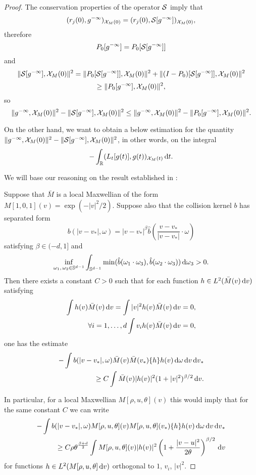 \begin{proof}
	The conservation properties of the operator $\mathcal S$ imply that 
	\[(r_j(0),  {g^{-\infty}})_{{\mathcal X_M(0)}}=
	(r_j(0),  \mathcal S[{g^{-\infty}}]  )_{{\mathcal X_M(0)}},\]
	therefore
	\[P_0[{g^{-\infty}}] = P_0[\mathcal S[{g^{-\infty}}]]\]
	and
	\[\|\mathcal S[{g^{-\infty}}],{\mathcal X_M(0)}\|^2 = \|P_0[\mathcal S[{g^{-\infty}}]],{\mathcal X_M(0)}\|^2+\|(I-P_0)[\mathcal S[{g^{-\infty}}]],{\mathcal X_M(0)}\|^2\]\[\ge 
	\|P_0[ {g^{-\infty}} ],{\mathcal X_M(0)}\|^2, \]
	so
	\[\|{g^{-\infty}},{\mathcal X_M(0)}\|^2-\|\mathcal S[{g^{-\infty}}],{\mathcal X_M(0)}\|^2  \le\|{g^{-\infty}},{\mathcal X_M(0)}\|^2-\|P_0[{g^{-\infty}}],{\mathcal X_M(0)}\|^2.\]


On the other hand, we want to obtain a below estimation for the quantity $\|{g^{-\infty}},{\mathcal X_M(0)}\|^2-\|\mathcal S[{g^{-\infty}}],{\mathcal X_M(0)}\|^2  $, in other words, on the integral  \[-\int_{{\mathbb R}}(L_t[g(t)],g(t))_{{\mathcal X_M(t)}}{\,\mathrm dt} .\]

We will base our reasoning on the result established in \cite{mouhot2007quantitative}:\begin{lemma}
	 Suppose that $\bar M $ is a local Maxwellian of the form $ M[1,0,1](v) = \exp(-|v|^2/2)$. Suppose also that the collision kernel $b$ has separated form
\[b(|v-v_*|,\omega) = |v-v_*|^{\beta} \hat b \left(\frac{v-v_*}{|v-v_*|}\cdot \omega\right)\]
satisfying $\beta\in(-d,1]$ and
\[\inf_{\omega_1,\, \omega_2\in{\mathbb S^{d-1}}}\int_{{\mathbb S^{d-1}}} \min(\hat b(\omega_1\cdot \omega_3),\hat b(\omega_2\cdot \omega_3)){\,\mathrm{d} \omega}_3>0.\]
 Then there exists a constant $C>0$ such that for each  function $h\in L^2(\bar M(v){\,\mathrm{d} v})$ satisfying
\[\begin{aligned}
	\int h(v)\bar M(v){\,\mathrm{d} v} =  \int|v|^2h(v)\bar M(v){\,\mathrm{d} v}=0,\\ \forall i=1,\dots , d \int v_i h(v)\bar M(v){\,\mathrm{d} v}=0,
\end{aligned}\] one has the estimate
\begin{equation}
	\label{eq:estimation}
	\begin{split}
		-\int b(|v-v_*|,\omega)\bar M(v)\bar M(v_*)\{h\}h(v){\,\mathrm{d} \omega}{\,\mathrm{d} v}{\,\mathrm{d} v}_*\\\ge C\int \bar M(v)|h(v)|^2 (1+|v|^2)^{\beta/2}{\,\mathrm{d} v}.
	\end{split}
\end{equation}
\end{lemma}
In particular, for a local Maxwellian $ M {[\rho,u,\theta]}(v)$ this would imply that
for the same constant $C$ we can write
\begin{equation}\label{eq:below}
	\begin{split}
		-\int b(|v-v_*|,\omega) M [{\rho,u,\theta}](v) M[{\rho,u,\theta}](v_*)\{h\}h(v){\,\mathrm{d} \omega}{\,\mathrm{d} v}{\,\mathrm{d} v}_*\\\ge C \rho \theta^{\frac{\beta+d}{2}}\int   M [\rho,u,\theta] (v)|h(v)|^2 \left(1+\frac{|v-u|^2}{2 \theta}\right)^{\beta/2}{\,\mathrm{d} v}
	\end{split}
\end{equation}
for functions $h\in L^2( M {[\rho,u,\theta]}{\,\mathrm{d} v})$ orthogonal to $1$, $v_i$, $|v|^2$.


\end{proof}
